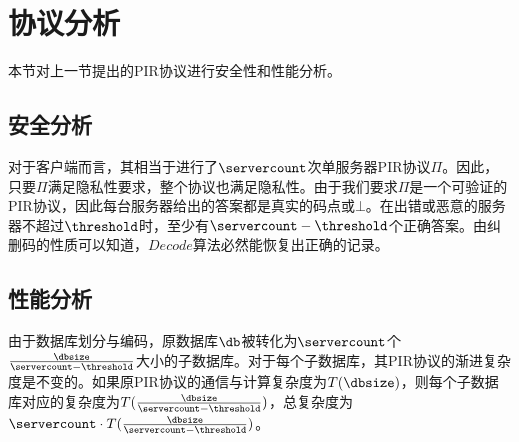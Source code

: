 \section{协议分析}
本节对上一节提出的PIR协议进行安全性和性能分析。

\subsection{安全分析}
对于客户端而言，其相当于进行了$\servercount$次单服务器PIR协议$\Pi$。因此，只要$\Pi$满足隐私性要求，整个协议也满足隐私性。由于我们要求$\Pi$是一个可验证的PIR协议，因此每台服务器给出的答案都是真实的码点或$\bot$。在出错或恶意的服务器不超过$\threshold$时，至少有$\servercount-\threshold$个正确答案。由纠删码的性质可以知道，$Decode$算法必然能恢复出正确的记录。

\subsection{性能分析}
由于数据库划分与编码，原数据库$\db$被转化为$\servercount$个$\frac{\dbsize}{\servercount-\threshold}$大小的子数据库。对于每个子数据库，其PIR协议的渐进复杂度是不变的。如果原PIR协议的通信与计算复杂度为$T(\dbsize)$，则每个子数据库对应的复杂度为$T(\frac{\dbsize}{\servercount-\threshold})$，总复杂度为$\servercount \cdot T(\frac{\dbsize}{\servercount-\threshold})$。